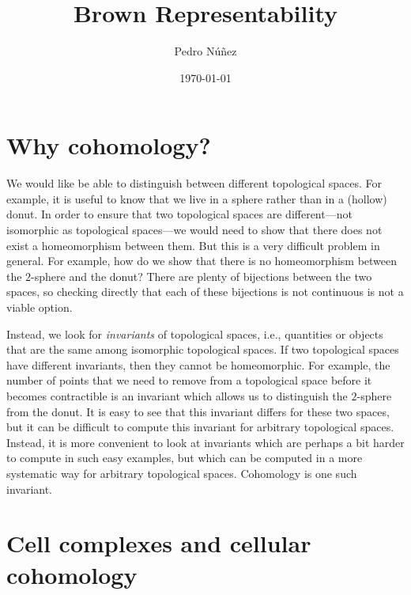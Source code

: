 \documentclass[12pt,a4paper]{amsart}
\title[Brown Representability]{Brown Representability}
\author[Pedro N\'{u}\~{n}ez]{Pedro N\'{u}\~{n}ez}\thanks{{\itshape Email:}~\href{mailto:pedro.nunez@math.uni-freiburg.de}{pedro.nunez@math.uni-freiburg.de}. \\ \indent {\itshape Homepage:}~\href{https://home.mathematik.uni-freiburg.de/nunez/?l=en}{https://home.mathematik.uni-freiburg.de/nunez}}
\date{\today}
\theoremstyle{plain}
\theoremstyle{definition}
\theoremstyle{remark}
\begin{document}
\maketitle

\tableofcontents

\section{Why cohomology?}

We would like be able to distinguish between different topological spaces.
For example, it is useful to know that we live in a sphere rather than in a (hollow) donut.
In order to ensure that two topological spaces are different---not isomorphic as topological spaces---we would need to show that there does not exist a homeomorphism between them.
But this is a very difficult problem in general.
For example, how do we show that there is no homeomorphism between the $2$-sphere and the donut?
There are plenty of bijections between the two spaces, so checking directly that each of these bijections is not continuous is not a viable option.

Instead, we look for \emph{invariants} of topological spaces, i.e., quantities or objects that are the same among isomorphic topological spaces.
If two topological spaces have different invariants, then they cannot be homeomorphic.
For example, the number of points that we need to remove from a topological space before it becomes contractible is an invariant which allows us to distinguish the $2$-sphere from the donut.
It is easy to see that this invariant differs for these two spaces, but it can be difficult to compute this invariant for arbitrary topological spaces.
Instead, it is more convenient to look at invariants which are perhaps a bit harder to compute in such easy examples, but which can be computed in a more systematic way for arbitrary topological spaces.
Cohomology is one such invariant.

\section{Cell complexes and cellular cohomology}
\end{document}
